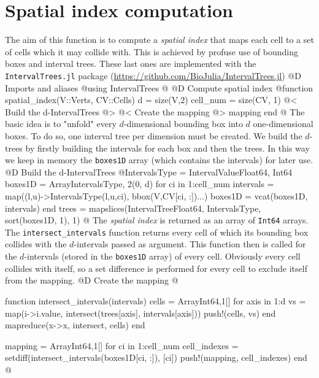 \documentclass[10pt,oneside]{article}
\begin{document}
\section{Spatial index computation}
The aim of this function is to compute a \textit{spatial index} that maps
each cell to a set of cells which it may collide with.
This is achieved by profuse use of bounding boxes and interval trees. 
These last ones are implemented with the \texttt{IntervalTrees.jl} package
(\url{https://github.com/BioJulia/IntervalTrees.jl})
@D Imports and aliases
@{using IntervalTrees
@}
@D Compute spatial index
@{function spatial_index(V::Verts, CV::Cells)
    d = size(V,2)
    cell_num = size(CV, 1)
    @< Build the d-IntervalTrees @>
    @< Create the mapping @>
    mapping
end
@}
The basic idea is to "unfold" every $d$-dimensional bounding box into $d$ one-dimensional boxes.
To do so, one interval tree per dimension must be created. 
We build the $d$-trees by firstly building the intervals for each box and then the trees.
In this way we keep in memory the \texttt{boxes1D} array (which contains the intervals) for later use.
@D Build the d-IntervalTrees
@{IntervalsType = IntervalValue{Float64, Int64}
boxes1D = Array{IntervalsType, 2}(0, d)
for ci in 1:cell_num
    intervals = map((l,u)->IntervalsType(l,u,ci), bbox(V,CV[ci, :])...)
    boxes1D = vcat(boxes1D, intervals)
end
trees = mapslices(IntervalTree{Float64, IntervalsType}, sort(boxes1D, 1), 1)
@}
The \textit{spatial index} is returned as an array of \texttt{Int64} arrays.
The \texttt{intersect\_intervals} function returns every cell of which its bounding box collides with 
the $d$-intervals passed as argument. This function then is called for the $d$-intervals (stored in the \texttt{boxes1D} array) of every cell.
Obviously every cell collides with itself, so a set difference is performed for every cell to exclude itself from the mapping.
@D Create the mapping
@{function intersect_intervals(intervals)
    cells = Array{Int64,1}[]
    for axis in 1:d
        vs = map(i->i.value, intersect(trees[axis], intervals[axis]))
        push!(cells, vs)
    end
    mapreduce(x->x, intersect, cells)
end

mapping = Array{Int64,1}[]
for ci in 1:cell_num
    cell_indexes = setdiff(intersect_intervals(boxes1D[ci, :]), [ci])
    push!(mapping, cell_indexes)
end
@}

\end{document}
